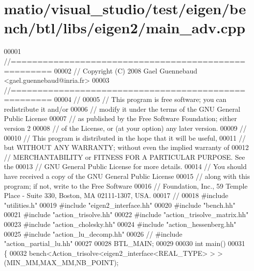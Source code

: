 \hypertarget{matio_2visual__studio_2test_2eigen_2bench_2btl_2libs_2eigen2_2main__adv_8cpp_source}{}\section{matio/visual\+\_\+studio/test/eigen/bench/btl/libs/eigen2/main\+\_\+adv.cpp}
\label{matio_2visual__studio_2test_2eigen_2bench_2btl_2libs_2eigen2_2main__adv_8cpp_source}

\begin{DoxyCode}
00001 \textcolor{comment}{//=====================================================}
00002 \textcolor{comment}{// Copyright (C) 2008 Gael Guennebaud <gael.guennebaud@inria.fr>}
00003 \textcolor{comment}{//=====================================================}
00004 \textcolor{comment}{//}
00005 \textcolor{comment}{// This program is free software; you can redistribute it and/or}
00006 \textcolor{comment}{// modify it under the terms of the GNU General Public License}
00007 \textcolor{comment}{// as published by the Free Software Foundation; either version 2}
00008 \textcolor{comment}{// of the License, or (at your option) any later version.}
00009 \textcolor{comment}{//}
00010 \textcolor{comment}{// This program is distributed in the hope that it will be useful,}
00011 \textcolor{comment}{// but WITHOUT ANY WARRANTY; without even the implied warranty of}
00012 \textcolor{comment}{// MERCHANTABILITY or FITNESS FOR A PARTICULAR PURPOSE.  See the}
00013 \textcolor{comment}{// GNU General Public License for more details.}
00014 \textcolor{comment}{// You should have received a copy of the GNU General Public License}
00015 \textcolor{comment}{// along with this program; if not, write to the Free Software}
00016 \textcolor{comment}{// Foundation, Inc., 59 Temple Place - Suite 330, Boston, MA  02111-1307, USA.}
00017 \textcolor{comment}{//}
00018 \textcolor{preprocessor}{#include "utilities.h"}
00019 \textcolor{preprocessor}{#include "eigen2\_interface.hh"}
00020 \textcolor{preprocessor}{#include "bench.hh"}
00021 \textcolor{preprocessor}{#include "action\_trisolve.hh"}
00022 \textcolor{preprocessor}{#include "action\_trisolve\_matrix.hh"}
00023 \textcolor{preprocessor}{#include "action\_cholesky.hh"}
00024 \textcolor{preprocessor}{#include "action\_hessenberg.hh"}
00025 \textcolor{preprocessor}{#include "action\_lu\_decomp.hh"}
00026 \textcolor{comment}{// #include "action\_partial\_lu.hh"}
00027 
00028 BTL\_MAIN;
00029 
00030 \textcolor{keywordtype}{int} main()
00031 \{
00032   bench<Action\_trisolve<eigen2\_interface<REAL\_TYPE> > >(MIN\_MM,MAX\_MM,NB\_POINT);

\end{DoxyCode}
